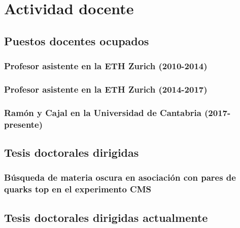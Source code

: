 \documentclass[a4paper, 11pt, twoside, openright]{report}
\begin{document}
\chapter{Actividad docente}

\section{Puestos docentes ocupados}
\subsection{Profesor asistente en la ETH Zurich (2010-2014)}


\subsection{Profesor asistente en la ETH Zurich (2014-2017)}


\subsection{Ramón y Cajal en la Universidad de Cantabria (2017-presente)}



\section{Tesis doctorales dirigidas}

\subsection{Búsqueda de materia oscura en asociación con pares de quarks top en el experimento CMS}


\section{Tesis doctorales dirigidas actualmente}
\end{document}
